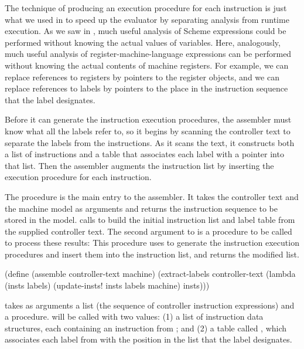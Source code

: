The technique of producing an execution procedure for each instruction is just
what we used in  to speed up the evaluator by separating
analysis from runtime execution.  As we saw in , much useful
analysis of Scheme expressions could be performed without knowing the actual
values of variables.  Here, analogously, much useful analysis of
register-machine-language expressions can be performed without knowing the
actual contents of machine registers.  For example, we can replace references
to registers by pointers to the register objects, and we can replace references
to labels by pointers to the place in the instruction sequence that the label
designates.

Before it can generate the instruction execution procedures, the assembler must
know what all the labels refer to, so it begins by scanning the controller text
to separate the labels from the instructions.  As it scans the text, it
constructs both a list of instructions and a table that associates each label
with a pointer into that list.  Then the assembler augments the instruction
list by inserting the execution procedure for each instruction.

The  procedure is the main entry to the assembler.  It takes the
controller text and the machine model as arguments and returns the instruction
sequence to be stored in the model.   calls
 to build the initial instruction list and label table
from the supplied controller text.  The second argument to
 is a procedure to be called to process these results:
This procedure uses  to generate the instruction execution
procedures and insert them into the instruction list, and returns the modified
list.

\begin{codeBlock}
(define (assemble controller-text machine)
  (extract-labels
   controller-text
   (lambda (insts labels)
     (update-insts! insts labels machine)
     insts)))
\end{codeBlock}

\noindent
{} takes as arguments a list  (the sequence of
controller instruction expressions) and a  procedure.
 will be called with two values: (1) a list  of
instruction data structures, each containing an instruction from ;
and (2) a table called , which associates each label from
 with the position in the list  that the label
designates.

